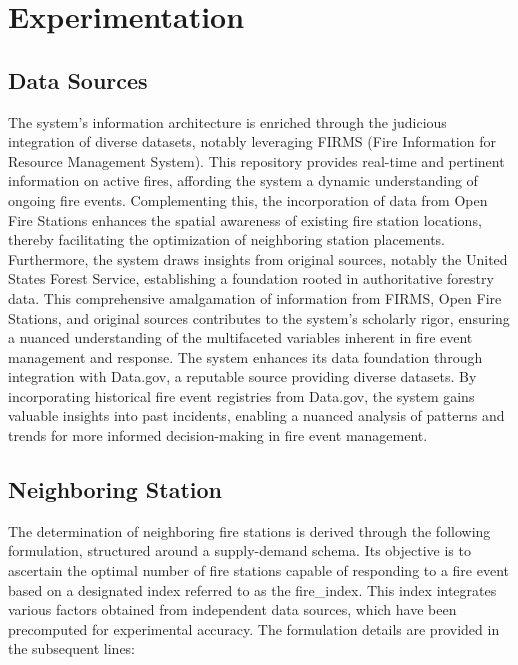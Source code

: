 \documentclass{scspaperproc}
\theoremstyle{scsthe}
\begin{document}
  
  
  
  \section{Experimentation}\label{Experimentation}
  
  
  \subsection{Data Sources}
  The system's information architecture is enriched through the judicious integration of diverse datasets, notably leveraging FIRMS (Fire Information for Resource Management System). This repository provides real-time and pertinent information on active fires, affording the system a dynamic understanding of ongoing fire events. Complementing this, the incorporation of data from Open Fire Stations enhances the spatial awareness of existing fire station locations, thereby facilitating the optimization of neighboring station placements. Furthermore, the system draws insights from original sources, notably the United States Forest Service, establishing a foundation rooted in authoritative forestry data. This comprehensive amalgamation of information from FIRMS, Open Fire Stations, and original sources contributes to the system's scholarly rigor, ensuring a nuanced understanding of the multifaceted variables inherent in fire event management and response.
  The system enhances its data foundation through integration with Data.gov, a reputable source providing diverse datasets. By incorporating historical fire event registries from Data.gov, the system gains valuable insights into past incidents, enabling a nuanced analysis of patterns and trends for more informed decision-making in fire event management.
  
  \subsection{Neighboring Station}
  
  
  The determination of neighboring fire stations is derived through the following formulation, structured around a supply-demand schema. Its objective is to ascertain the optimal number of fire stations capable of responding to a fire event based on a designated index referred to as the fire\_index. This index integrates various factors obtained from independent data sources, which have been precomputed for experimental accuracy. The formulation details are provided in the subsequent lines:
  
\end{document}
